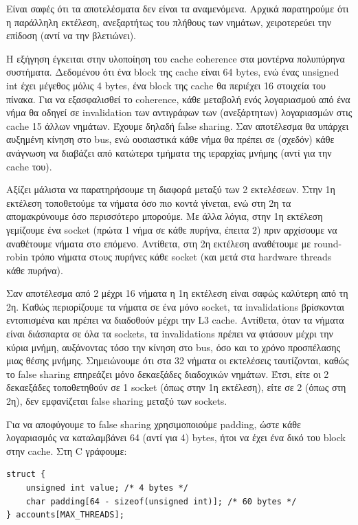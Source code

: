 \documentclass[12pt,titlepage]{article}
\begin{document}
Είναι σαφές ότι τα αποτελέσματα δεν είναι τα αναμενόμενα. Αρχικά παρατηρούμε ότι
η παράλληλη εκτέλεση, ανεξαρτήτως του πλήθους των νημάτων, χειροτερεύει την
επίδοση (αντί να την βλετιώνει).

Η εξήγηση έγκειται στην υλοποίηση του cache coherence στα μοντέρνα πολυπύρηνα
συστήματα. Δεδομένου ότι ένα block της cache είναι 64 bytes, ενώ ένας unsigned
int έχει μέγεθος μόλις 4 bytes, ένα block της cache θα περιέχει 16 στοιχεία του
πίνακα. Για να εξασφαλισθεί το coherence, κάθε μεταβολή ενός λογαριασμού από ένα
νήμα θα οδηγεί σε invalidation των αντιγράφων των (ανεξάρτητων) λογαριασμών στις
cache 15 άλλων νημάτων. Έχουμε δηλαδή false sharing. Σαν αποτέλεσμα θα υπάρχει
αυξημένη κίνηση στο bus, ενώ ουσιαστικά κάθε νήμα θα πρέπει σε (σχεδόν) κάθε
ανάγνωση να διαβάζει από κατώτερα τμήματα της ιεραρχίας μνήμης (αντί για την
cache του).

Αξίζει μάλιστα να παρατηρήσουμε τη διαφορά μεταξύ των 2 εκτελέσεων. Στην 1η
εκτέλεση τοποθετούμε τα νήματα όσο πιο κοντά γίνεται, ενώ στη 2η τα
απομακρύνουμε όσο περισσότερο μπορούμε. Με άλλα λόγια, στην 1η εκτέλεση
γεμίζουμε ένα socket (πρώτα 1 νήμα σε κάθε πυρήνα, έπειτα 2) πριν αρχίσουμε να
αναθέτουμε νήματα στο επόμενο. Αντίθετα, στη 2η εκτέλεση αναθέτουμε με
round-robin τρόπο νήματα στoυς πυρήνες κάθε socket (και μετά στα hardware
threads κάθε πυρήνα).

Σαν αποτέλεσμα από 2 μέχρι 16 νήματα η 1η εκτέλεση είναι σαφώς καλύτερη από τη
2η. Καθώς περιορίζουμε τα νήματα σε ένα μόνο socket, τα invalidations βρίσκονται
εντοπισμένα και πρέπει να διαδοθούν μέχρι την L3 cache. Αντίθετα, όταν τα νήματα
είναι διάσπαρτα σε όλα τα sockets, τα invalidations πρέπει να φτάσουν μέχρι την
κύρια μνήμη, αυξάνοντας τόσο την κίνηση στο bus, όσο και το χρόνο προσπέλασης
μιας θέσης μνήμης. Σημειώνουμε ότι στα 32 νήματα οι εκτελέσεις ταυτίζονται,
καθώς το false sharing επηρεάζει μόνο δεκαεξάδες διαδοχικών νημάτων. Έτσι, είτε
οι 2 δεκαεξάδες τοποθετηθούν σε 1 socket (όπως στην 1η εκτέλεση), είτε σε 2
(όπως στη 2η), δεν εμφανίζεται false sharing μεταξύ των sockets.

Για να αποφύγουμε το false sharing χρησιμοποιούμε padding, ώστε κάθε λογαριασμός
να καταλαμβάνει 64 (αντί για 4) bytes, ήτοι να έχει ένα δικό του block στην
cache. Στη C γράφουμε:

\begin{verbatim}
struct {
    unsigned int value; /* 4 bytes */
    char padding[64 - sizeof(unsigned int)]; /* 60 bytes */
} accounts[MAX_THREADS];
\end{verbatim}
\end{document}
